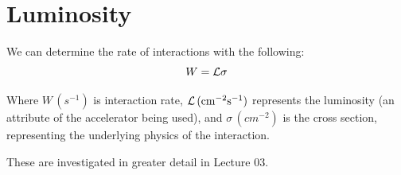 \begin{center}
\end{center}

\section{Luminosity}
We can determine the rate of interactions with the following:
\[
    W = \LL \sigma
\]

Where $W \, (\si{s^{-1}})$ is interaction rate, $\LL \, (\si{cm^{-2} s^{-1}})$ represents the luminosity (an attribute of the accelerator being used), and $\sigma \, (\si{cm^{-2}})$ is the cross section, representing the underlying physics of the interaction.

These are investigated in greater detail in Lecture 03.
